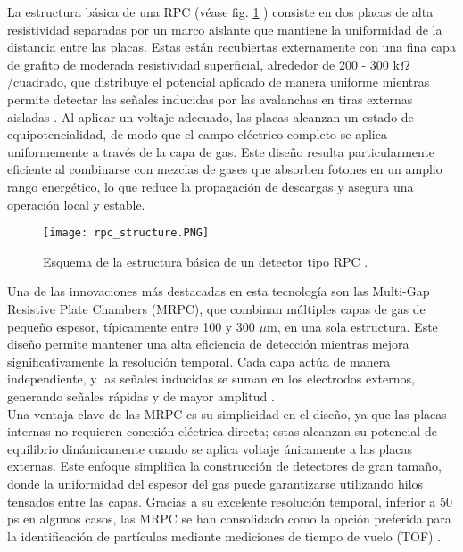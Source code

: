 \documentclass{report}
\begin{document}
\noindent La estructura básica de una RPC (véase fig. \ref{fig:RPC} ) consiste en dos placas de alta resistividad separadas por un marco aislante que mantiene la uniformidad de la distancia entre las placas. Estas están recubiertas externamente con una fina capa de grafito de moderada resistividad superficial, alrededor de 200 - 300 k$\Omega$/cuadrado, que distribuye el potencial aplicado de manera uniforme mientras permite detectar las señales inducidas por las avalanchas en tiras externas aisladas \cite{sauli2015gaseous4}. Al aplicar un voltaje adecuado, las placas alcanzan un estado de equipotencialidad, de modo que el campo eléctrico completo se aplica uniformemente a través de la capa de gas. Este diseño resulta particularmente eficiente al combinarse con mezclas de gases que absorben fotones en un amplio rango energético, lo que reduce la propagación de descargas y asegura una operación local y estable.

\begin{figure}[H]
    \centering
    \texttt{[image: rpc\_structure.PNG]}
    \caption{Esquema de la estructura básica de un detector tipo RPC \cite{sauli2015gaseous4}.}
    \label{fig:RPC}
\end{figure}

\noindent Una de las innovaciones más destacadas en esta tecnología son las Multi-Gap Resistive Plate Chambers (MRPC), que combinan múltiples capas de gas de pequeño espesor, típicamente entre 100  y 300 $\mu$m, en una sola estructura. Este diseño permite mantener una alta eficiencia de detección mientras mejora significativamente la resolución temporal. Cada capa actúa de manera independiente, y las señales inducidas se suman en los electrodos externos, generando señales rápidas y de mayor amplitud \cite{alici2013mrpc}. \\

\noindent Una ventaja clave de las MRPC es su simplicidad en el diseño, ya que las placas internas no requieren conexión eléctrica directa; estas alcanzan su potencial de equilibrio dinámicamente cuando se aplica voltaje únicamente a las placas externas. Este enfoque simplifica la construcción de detectores de gran tamaño, donde la uniformidad del espesor del gas puede garantizarse utilizando hilos tensados entre las capas. Gracias a su excelente resolución temporal, inferior a 50 ps en algunos casos, las MRPC se han consolidado como la opción preferida para la identificación de partículas mediante mediciones de tiempo de vuelo (TOF) \cite{alici2013mrpc}. \\
\end{document}
